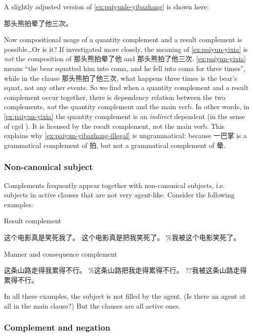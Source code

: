 \documentclass[../main.tex]{subfiles}
\begin{document}
A slightly adjusted version of \eqref{ex:paiyunle-yibazhang} is shown here:
\begin{exe}
    \ex 那头熊拍晕了他三次。
    \label{ex:paiyun-yixia}
\end{exe}
Now compositional usage of a quantity complement and a result complement is possible\dots Or is it?
If investigated more closely, the meaning of \eqref{ex:paiyun-yixia} is \emph{not} the composition 
of 那头熊拍晕了他 and 那头熊拍了他三次. \eqref{ex:paiyun-yixia} means ``the bear squatted him into
coma, and he fell into coma for three times'', while in the clause 那头熊拍了他三次, what happens 
three times is the bear's squat, not any other events. So we find when a quantity complement 
and a result complement occur together, there is dependency relation between the two complements, 
\emph{not} the quantity complement and the main verb. In other words, in \eqref{ex:paiyun-yixia}
the quantity complement is an \emph{indirect} dependent (in the sense of \ac{cgel} ). 
It is licensed by the result complement, not the main verb. This explains why \eqref{ex:paiyun-yibazhang-illegal}
is ungrammatical: because 一巴掌 is a grammatical complement of 拍, but not a grammatical complement of 晕.

\subsubsection{Non-canonical subject}

Complements frequently appear together with non-canonical subjects, 
i.e. subjects in active clauses that are not very agent-like. 
Consider the following examples:
\begin{exe}
    \ex Result complement
    \begin{xlist}
        \ex 这个电影真是笑死我了。
        \ex 这个电影真是把我笑死了。
        \ex \%我被这个电影笑死了。 %
    \end{xlist}
    \ex Manner and consequence complement 
    \begin{xlist}
        \ex 这条山路走得我累得不行。
        \ex \%这条山路把我走得累得不行。 %
        \ex ??我被这条山路走得累得不行。
    \end{xlist}
\end{exe}

In all these examples, the subject is not filled by the agent. 
(Is there an agent at all in the main clause?)
But the clauses are all active ones. 

\subsubsection{Complement and negation}
\end{document}
